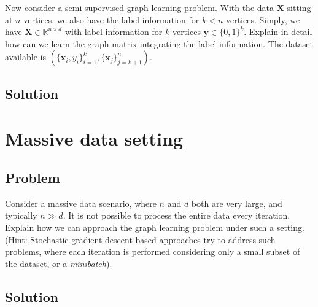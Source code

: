 \documentclass[a4paper]{article}
\newcommand{\mf}{\mathbf}
\newcommand{\R}{\mathbb{R}}
\begin{document}
Now consider a semi-supervised graph learning problem. With the data $\mf{X}$ sitting at $n$ vertices, we also have the label information for $k < n$ vertices. Simply, we have $\mf{X} \in \R^{n \times
d}$ with label information for $k$ vertices $\mf{y} \in \{0, 1\}^k$. Explain in detail how can we learn the graph matrix integrating the label information. The dataset available is
$\left(\{\mf{x}_i, y_i\}_{i = 1}^k, \{\mf{x}_j\}_{j = k + 1}^n\right)$.

\subsection{Solution}


\newpage

\section{Massive data setting}

\subsection{Problem}

Consider a massive data scenario, where $n$ and $d$ both are very large, and typically $n \gg d$. It is not possible to process the entire data every iteration. Explain how we can approach
the graph learning problem under such a setting. (Hint: Stochastic gradient descent based approaches try to address such problems, where each iteration is performed considering only a small
subset of the dataset, or a \emph{minibatch}).

\subsection{Solution}
\end{document}
